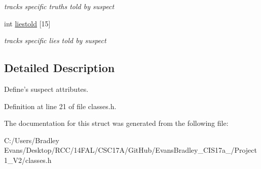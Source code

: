 \begin{DoxyCompactItemize}
\begin{DoxyCompactList}\small\item\em tracks specific truths told by suspect \end{DoxyCompactList}\item 
\hypertarget{struct_suspect__s_ac6bb03316c123969e86e76ca78c3e010}{int \hyperlink{struct_suspect__s_ac6bb03316c123969e86e76ca78c3e010}{liestold} \mbox{[}15\mbox{]}}\label{struct_suspect__s_ac6bb03316c123969e86e76ca78c3e010}

\begin{DoxyCompactList}\small\item\em tracks specific lies told by suspect \end{DoxyCompactList}\end{DoxyCompactItemize}


\subsection{Detailed Description}
Define's suspect attributes. 

Definition at line 21 of file classes.\+h.



The documentation for this struct was generated from the following file\+:\begin{DoxyCompactItemize}
\item 
C\+:/\+Users/\+Bradley Evans/\+Desktop/\+R\+C\+C/14\+F\+A\+L/\+C\+S\+C17\+A/\+Git\+Hub/\+Evans\+Bradley\+\_\+\+C\+I\+S17a\+\_/\+Project 1\+\_\+\+V2/classes.\+h\end{DoxyCompactItemize}
